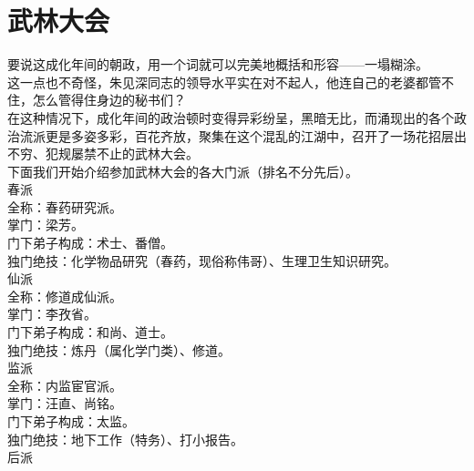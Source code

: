 \section{武林大会}
\ifnum{}
	\begin{multicols}{\theparacolNo}
\fi
要说这成化年间的朝政，用一个词就可以完美地概括和形容——一塌糊涂。\\

这一点也不奇怪，朱见深同志的领导水平实在对不起人，他连自己的老婆都管不住，怎么管得住身边的秘书们？\\

在这种情况下，成化年间的政治顿时变得异彩纷呈，黑暗无比，而涌现出的各个政治流派更是多姿多彩，百花齐放，聚集在这个混乱的江湖中，召开了一场花招层出不穷、犯规屡禁不止的武林大会。\\

下面我们开始介绍参加武林大会的各大门派（排名不分先后）。\\

春派\\

全称：春药研究派。\\

掌门：梁芳。\\

门下弟子构成：术士、番僧。\\

独门绝技：化学物品研究（春药，现俗称伟哥）、生理卫生知识研究。\\

仙派\\

全称：修道成仙派。\\

掌门：李孜省。\\

门下弟子构成：和尚、道士。\\

独门绝技：炼丹（属化学门类）、修道。\\

监派\\

全称：内监宦官派。\\

掌门：汪直、尚铭。\\

门下弟子构成：太监。\\

独门绝技：地下工作（特务）、打小报告。\\

后派\\


\end{multicols}
